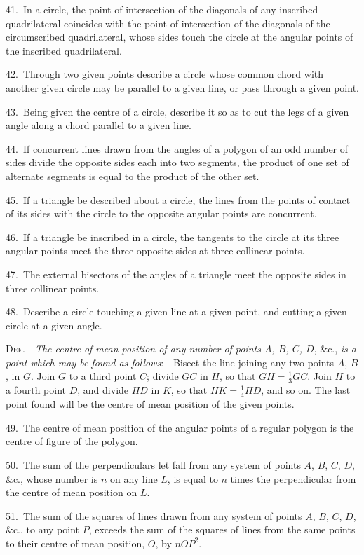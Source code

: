 \documentclass[oneside]{book}
\begin{document}
\begin{footnotesize}
41.~In a circle, the point of intersection of the diagonals of any
inscribed quadrilateral coincides with the point of intersection of
the diagonals of the circumscribed quadrilateral, whose sides touch
the circle at the angular points of the inscribed quadrilateral.

42.~Through two given points describe a circle whose common
chord with another given circle may be parallel to a given line,
or pass through a given point.

43.~Being given the centre of a circle, describe it so as to cut
the legs of a given angle along a chord parallel to a given line.

44.~If concurrent lines drawn from the angles of a polygon of
an odd number of sides divide the opposite sides each into two
segments, the product of one set of alternate segments is equal to
the product of the other set.

45.~If a triangle be described about a circle, the lines from the
points of contact of its sides with the circle to the opposite angular
points are concurrent.

46.~If a triangle be inscribed in a circle, the tangents to the
circle at its three angular points meet the three opposite sides at
three collinear points.

47.~The external bisectors of the angles of a triangle meet the
opposite sides in three collinear points.

48.~Describe a circle touching a given line at a given point,
and cutting a given circle at a given angle.


\textsc{Def.}---\textit{The centre of mean position of any number of points
$A$, $B$, $C$, $D$}, \&c., \textit{is a point which may be found as follows}:---Bisect
the line joining any two points $A$, $B$, in $G$. Join $G$ to a
third point $C$; divide $GC$ in $H$, so that $GH = \frac{1}{3} GC$. Join $H$ to a
fourth point $D$, and divide $HD$ in $K$, so that $HK = \frac{1}{4} HD$, and so
on. The last point found will be the centre of mean position of
the given points.

49.~The centre of mean position of the angular points of a
regular polygon is the centre of figure of the polygon.

50.~The sum of the perpendiculars let fall from any system of
points $A$, $B$, $C$, $D$, \&c., whose number is $n$ on any line $L$, is equal
to $n$ times the perpendicular from the centre of mean position
on $L$.

51.~The sum of the squares of lines drawn from any system of
points $A$, $B$, $C$, $D$, \&c., to any point $P$, exceeds the sum of the
squares of lines from the same points to their centre of mean
position, $O$, by $nOP^{2}$.


\end{footnotesize}
\end{document}
